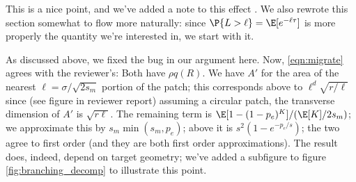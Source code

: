 \reply
This is a nice point,
and we've added a note to this effect \revref.
We also rewrote this section somewhat to flow more naturally:
since $\P\{L>\ell\}=\E[e^{-\ell\tau}]$ is more properly the quantity we're interested in,
we start with it.



\reply
As discussed above, we fixed the bug in our argument here.
Now, \eqref{eqn:migrate} agrees with the reviewer's:
Both have $\rho q(R)$.
We have $A'$ for the area of the nearest $\ell=\sigma/\sqrt{2s_m}$ portion of the patch;
this corresponds above to $\ell^{d} \sqrt{r/\ell}$
since (see figure in reviewer report) assuming a circular patch, the transverse dimension of $A'$ is $\sqrt{r\ell}$.
The remaining term is $\E[1-(1-p_e)^K]/(\E[K]/2s_m)$;
we approximate this by $s_m \min(s_m,p_e)$; 
above it is $s^2 (1-e^{-p_e/s})$;
the two agree to first order (and they are both first order approximations).
The result does, indeed, depend on target geometry;
we've added a subfigure to figure \ref{fig:branching_decomp} to illustrate this point.

